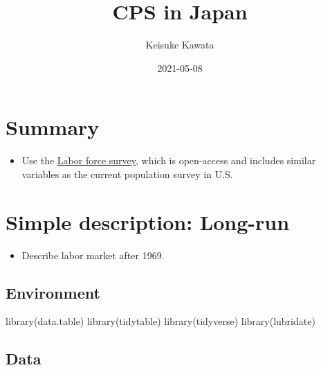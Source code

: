 \documentclass[
]{book}
\title{CPS in Japan}
\author{Keisuke Kawata}
\date{2021-05-08}
\newenvironment{Shaded}{\begin{snugshade}}{\end{snugshade}}
\newcommand{\FunctionTok}[1]{\textcolor[rgb]{0.00,0.00,0.00}{#1}}
\newcommand{\NormalTok}[1]{#1}
\providecommand{\tightlist}{%
  \setlength{\itemsep}{0pt}\setlength{\parskip}{0pt}}
\begin{document}
\maketitle

{
\setcounter{tocdepth}{1}
\tableofcontents
}
\hypertarget{summary}{%
\chapter{Summary}\label{summary}}

\begin{itemize}
\tightlist
\item
  Use the \href{https://www.stat.go.jp/english/data/roudou/index.html}{Labor force survey}, which is open-access and includes similar variables as the current population survey in U.S.
\end{itemize}

\hypertarget{simple-description-long-run}{%
\chapter{Simple description: Long-run}\label{simple-description-long-run}}

\begin{itemize}
\tightlist
\item
  Describe labor market after 1969.
\end{itemize}

\hypertarget{environment}{%
\section{Environment}\label{environment}}

\begin{Shaded}
\begin{Highlighting}[]
\FunctionTok{library}\NormalTok{(data.table)}
\FunctionTok{library}\NormalTok{(tidytable)}
\FunctionTok{library}\NormalTok{(tidyverse)}
\FunctionTok{library}\NormalTok{(lubridate)}
\end{Highlighting}
\end{Shaded}

\hypertarget{data}{%
\section{Data}\label{data}}
\end{document}
